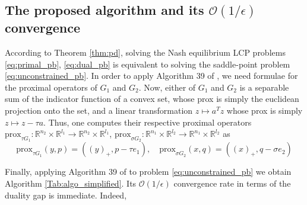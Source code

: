 \documentclass[12pt]{article}
\begin{document}
\subsection{The proposed algorithm and its $\mathcal{O}(1/\epsilon)$ convergence}
According to Theorem \ref{thm:pd}, solving the Nash equilibrium LCP problems \eqref{eq:primal_pb}, \eqref{eq:dual_pb} is equivalent to solving the saddle-point problem \eqref{eq:unconstrained_pb}.
In order to apply Algorithm 39 of \cite{chambolle2010}, we need formulae for the proximal operators of
$G_1$ and $G_2$. Now, either of $G_1$ and $G_2$ is a separable sum of the indicator function of a convex set, whose prox is simply the euclidean projection onto the set,  and a linear transformation $z \mapsto a^Tz$ whose prox is simply $z \mapsto z - \tau a$. Thus,  one computes their respective proximal operators $\text{prox}_{\tau G_1} : \mathbb{R}^{n_2} \times \mathbb{R}^{l_1} \rightarrow \mathbb{R}^{n_2} \times \mathbb{R}^{l_1}$, $\text{prox}_{\sigma G_2}: \mathbb{R}^{n_1} \times \mathbb{R}^{l_2} \rightarrow \mathbb{R}^{n_1} \times \mathbb{R}^{l_2}$ as
  \begin{equation}
    \text{prox}_{\tau G_1}(y, p) = ((y)_+, p - \tau e_1), \hspace{1em} \text{prox}_{\sigma G_2}(x, q) = ((x)_+, q - \sigma e_2)
  \end{equation}

Finally, applying Algorithm 39 of \cite{chambolle2010} to problem \eqref{eq:unconstrained_pb} we obtain Algorithm \ref{Tab:algo_simplified}. Its $\mathcal{O}(1/\epsilon)$ convergence rate in terms of the duality gap is immediate. Indeed,
\end{document}

